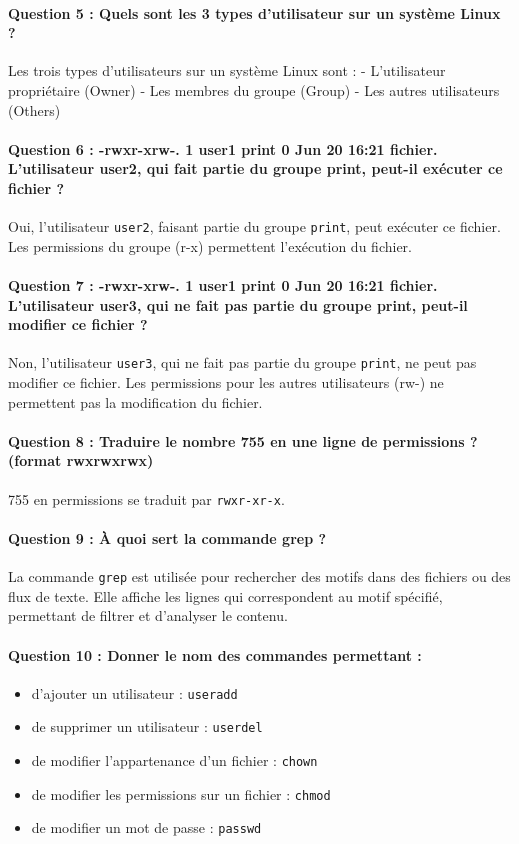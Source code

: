 \documentclass[a4paper,10pt]{article}
\begin{document}
\paragraph{Question 5 : Quels sont les 3 types d’utilisateur sur un système Linux ?}
Les trois types d'utilisateurs sur un système Linux sont :
- L'utilisateur propriétaire (Owner)
- Les membres du groupe (Group)
- Les autres utilisateurs (Others)

\paragraph{Question 6 : -rwxr-xrw-. 1 user1 print 0 Jun 20 16:21 fichier. L’utilisateur user2, qui fait partie du groupe print, peut-il exécuter ce fichier ?}
Oui, l'utilisateur \texttt{user2}, faisant partie du groupe \texttt{print}, peut exécuter ce fichier. Les permissions du groupe (r-x) permettent l'exécution du fichier.

\paragraph{Question 7 : -rwxr-xrw-. 1 user1 print 0 Jun 20 16:21 fichier. L’utilisateur user3, qui ne fait pas partie du groupe print, peut-il modifier ce fichier ?}
Non, l'utilisateur \texttt{user3}, qui ne fait pas partie du groupe \texttt{print}, ne peut pas modifier ce fichier. Les permissions pour les autres utilisateurs (rw-) ne permettent pas la modification du fichier.

\paragraph{Question 8 : Traduire le nombre 755 en une ligne de permissions ? (format rwxrwxrwx)}
755 en permissions se traduit par \texttt{rwxr-xr-x}.

\paragraph{Question 9 : À quoi sert la commande grep ?}
La commande \texttt{grep} est utilisée pour rechercher des motifs dans des fichiers ou des flux de texte. Elle affiche les lignes qui correspondent au motif spécifié, permettant de filtrer et d'analyser le contenu.

\paragraph{Question 10 : Donner le nom des commandes permettant :}
\begin{itemize}
    \item d’ajouter un utilisateur : \texttt{useradd}
    \item de supprimer un utilisateur : \texttt{userdel}
    \item de modifier l’appartenance d’un fichier : \texttt{chown}
    \item de modifier les permissions sur un fichier : \texttt{chmod}
    \item de modifier un mot de passe : \texttt{passwd}
\end{itemize}
\end{document}
